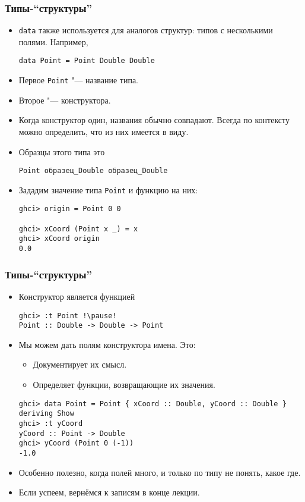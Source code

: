 \documentclass[10pt]{beamer}
\begin{document}
\begin{frame}[fragile]
\frametitle{Типы-\enquote{структуры}}
\begin{itemize}
    \item \lstinline|data| также используется для аналогов структур: типов с несколькими полями. Например,
\begin{lstlisting}[basicstyle=\ttfamily\footnotesize]
data Point = Point Double Double
\end{lstlisting}
    \item Первое \lstinline|Point| "--- название типа.
    \item Второе "--- конструктора.
    \item Когда конструктор один, названия обычно совпадают. Всегда по контексту можно определить, что из них имеется в виду.
    \item Образцы этого типа \pause это\\
\begin{lstlisting}[basicstyle=\ttfamily\footnotesize]
Point образец_Double образец_Double
\end{lstlisting}
    \item Зададим значение типа \lstinline|Point| и функцию на них:
\begin{lstlisting}[basicstyle=\ttfamily\footnotesize]
ghci> origin = Point 0 0

ghci> xCoord (Point x _) = x
ghci> xCoord origin
0.0
\end{lstlisting}
\end{itemize}
\end{frame}

\begin{frame}[fragile]
\frametitle{Типы-\enquote{структуры}}
\begin{itemize}
    \item Конструктор является функцией
\begin{lstlisting}
ghci> :t Point !\pause!
Point :: Double -> Double -> Point
\end{lstlisting}
    \item Мы можем дать полям конструктора имена. Это:\hypertarget{rec1}{}
    \begin{itemize}
        \item Документирует их смысл.
        \item Определяет функции, возвращающие их значения.
    \end{itemize}
\begin{lstlisting}
ghci> data Point = Point { xCoord :: Double, yCoord :: Double } deriving Show
ghci> :t yCoord
yCoord :: Point -> Double
ghci> yCoord (Point 0 (-1))
-1.0
\end{lstlisting}
\item Особенно полезно, когда полей много, и только по типу не понять, какое где.
\item Если успеем, вернёмся к записям в конце лекции. \hyperlink{rec2}{}
\end{itemize}
\end{frame}
\end{document}
